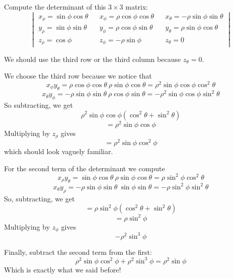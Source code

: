 \documentclass[11pt, oneside]{article}
\begin{document}
Compute the determinant of this $3 \times 3$ matrix:
\[ \begin{vmatrix}
x_{\rho} = \sin \phi \cos \theta && x_{\phi}  = \rho \cos \phi \cos \theta &&x_{\theta} = -\rho \sin \phi \sin \theta  \\
y_{\rho} = \sin \phi \sin \theta && y_{\phi}  = \rho \cos \phi \sin \theta && y_{\theta} = \rho \sin \phi \cos \theta  \\
z_{\rho} = \cos \phi &&  z_{\phi}  = -\rho \sin \phi && z_{\theta} = 0
\end{vmatrix} \]

We should use the third row or the third column because $z_{\theta} = 0$.  

We choose the third row because we notice that
\[ x_{\phi} y_{\theta} = \rho \cos \phi \cos \theta \ \rho \sin \phi \cos \theta = \rho^2 \sin \phi \cos \phi \cos^2 \theta \]
\[ x_{\theta} y_{\phi} = -\rho \sin \phi \sin \theta \ \rho \cos \phi \sin \theta = -\rho^2 \sin \phi \cos \phi \sin^2 \theta \]
So subtracting, we get 
\[ \rho^2 \sin \phi \cos \phi (\cos^2 \theta + \sin^2 \theta) \]
\[ = \rho^2 \sin \phi \cos \phi \]
Multiplying by $z_\rho$ gives
\[ = \rho^2 \sin \phi \cos^2 \phi \]
which should look vaguely familiar.

For the second term of the determinant we compute
\[ x_{\rho} y_{\theta} = \sin \phi \cos \theta \ \rho \sin \phi \cos \theta  = \rho \sin^2 \phi \cos^2 \theta \]
\[ x_{\theta} y_{\rho} = -\rho \sin \phi \sin \theta \ \sin \phi \sin \theta = -\rho \sin^2 \phi \sin^2 \theta \]
So, subtracting, we get
\[ = \rho \sin^2 \phi (\cos^2 \theta + \sin^2 \theta) \]
\[ = \rho \sin^2 \phi \]
Multiplying by $z_\phi$ gives
\[ - \rho^2 \sin^3 \phi \]

Finally, subtract the second term from the first:
\[ \rho^2 \sin \phi \cos^2 \phi + \rho^2 \sin^3 \phi  = \rho^2 \sin \phi \]
Which is exactly what we said before!
\end{document}
